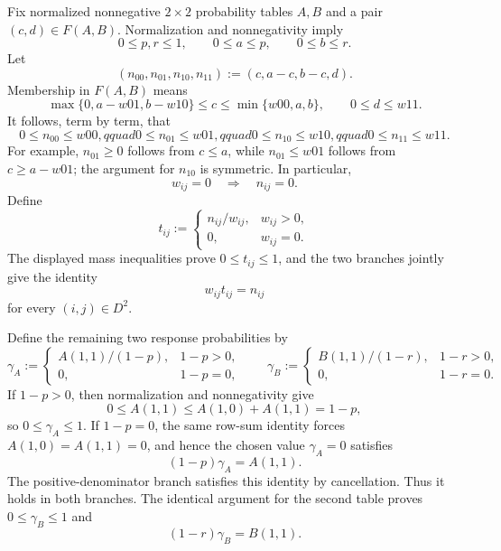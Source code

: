 Fix normalized nonnegative \(2\times2\) probability tables \(A,B\) and a pair \((c,d)\in F(A,B)\).  Normalization and nonnegativity imply
\[
0\le p,r\le1,\qquad 0\le a\le p,\qquad 0\le b\le r.
\]
Let
\[
(n_{00},n_{01},n_{10},n_{11}):=(c,a-c,b-c,d).
\]
Membership in \(F(A,B)\) means
\[
\max\{0,a-w01,b-w10\}\le c\le\min\{w00,a,b\},
\qquad 0\le d\le w11.
\]
It follows, term by term, that
\[
0\le n_{00}\le w00,qquad
0\le n_{01}\le w01,qquad
0\le n_{10}\le w10,qquad
0\le n_{11}\le w11.
\]
For example, \(n_{01}\ge0\) follows from \(c\le a\), while \(n_{01}\le w01\) follows from \(c\ge a-w01\); the argument for \(n_{10}\) is symmetric.  In particular,
\[
w_{ij}=0\quad\Longrightarrow\quad n_{ij}=0.
\]
Define
\[
t_{ij}:=
\begin{cases}
n_{ij}/w_{ij},&w_{ij}>0,\\
0,&w_{ij}=0.
\end{cases}
\]
The displayed mass inequalities prove \(0\le t_{ij}\le1\), and the two branches jointly give the identity
\[
w_{ij}t_{ij}=n_{ij}
\]
for every \((i,j)\in D^2\).

Define the remaining two response probabilities by
\[
\gamma_A:=
\begin{cases}
A(1,1)/(1-p),&1-p>0,\\
0,&1-p=0,
\end{cases}
\qquad
\gamma_B:=
\begin{cases}
B(1,1)/(1-r),&1-r>0,\\
0,&1-r=0.
\end{cases}
\]
If \(1-p>0\), then normalization and nonnegativity give
\[
0\le A(1,1)\le A(1,0)+A(1,1)=1-p,
\]
so \(0\le\gamma_A\le1\).  If \(1-p=0\), the same row-sum identity forces \(A(1,0)=A(1,1)=0\), and hence the chosen value \(\gamma_A=0\) satisfies
\[
(1-p)\gamma_A=A(1,1).
\]
The positive-denominator branch satisfies this identity by cancellation.  Thus it holds in both branches.  The identical argument for the second table proves \(0\le\gamma_B\le1\) and
\[
(1-r)\gamma_B=B(1,1).
\]

